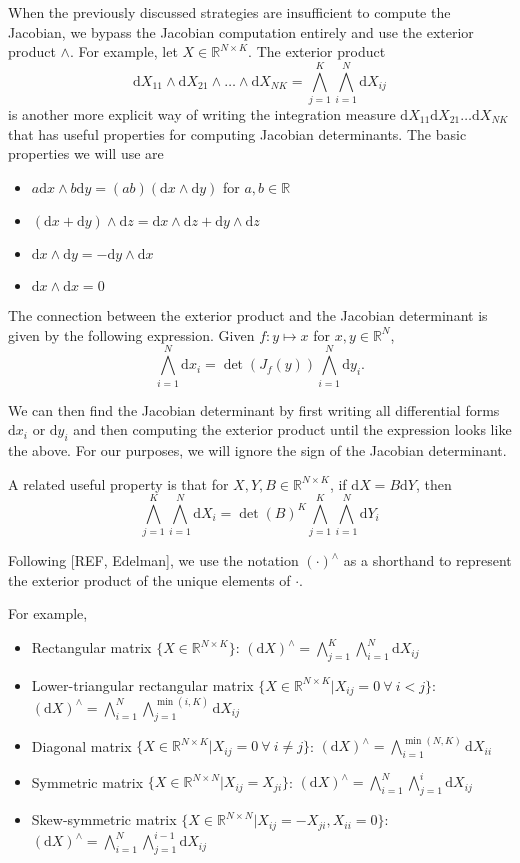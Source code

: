 \documentclass[11pt]{article}
\newcommand{\dv}[1]{\mathrm{d}{#1}}
\begin{document}
When the previously discussed strategies are insufficient to compute the Jacobian, we bypass the Jacobian computation entirely and use the exterior product $\wedge$.
For example, let $X \in \mathbb{R}^{N \times K}$.
The exterior product
\[
  \dv{X_{11} }\wedge \dv{X_{21}} \wedge \ldots \wedge \dv{X_{NK}} = \bigwedge_{j=1}^K \bigwedge_{i=1}^N \dv{X}_{ij}
\]
is another more explicit way of writing the integration measure $\dv{X_{11}} \dv{X_{21}} \dots \dv{X_{NK}}$ that has useful properties for computing Jacobian determinants.
The basic properties we will use are

\begin{itemize}
  \item $a\dv{x} \wedge b\dv{y} = (ab)(\dv{x} \wedge \dv{y})$ for $a,b \in \mathbb{R}$
  \item $(\dv{x} + \dv{y}) \wedge \dv{z} = \dv{x} \wedge \dv{z} + \dv{y} \wedge \dv{z}$
  \item $\dv{x} \wedge \dv{y} = - \dv{y} \wedge \dv{x}$
  \item $\dv{x} \wedge \dv{x} = 0$
\end{itemize}

The connection between the exterior product and the Jacobian determinant is given by the following expression.
Given $f: y \mapsto x$ for $x,y \in \mathbb{R}^N$,
\[\bigwedge_{i=1}^N \dv{x_i} = \det(J_f(y)) \bigwedge_{i=1}^N \dv{y_i}.\]

We can then find the Jacobian determinant by first writing all differential forms $\dv{x_i}$ or $\dv{y_i}$ and then computing the exterior product until the expression looks like the above.
For our purposes, we will ignore the sign of the Jacobian determinant.

A related useful property is that for $X,Y,B \in \mathbb{R}^{N \times K}$, if $\dv{X} = B \dv{Y}$, then
\[\bigwedge_{j=1}^K \bigwedge_{i=1}^N \dv{X_i} = \det(B)^K \bigwedge_{j=1}^K \bigwedge_{i=1}^N \dv{Y_i}\]

Following [REF, Edelman], we use the notation $(\cdot)^\wedge$ as a shorthand to represent the exterior product of the unique elements of $\cdot$.

For example,
\begin{itemize}
  \item Rectangular matrix $\{X \in \mathbb{R}^{N \times K}\}$: $(\dv{X})^\wedge = \bigwedge_{j=1}^K \bigwedge_{i=1}^N \dv{X_{ij}}$
  \item Lower-triangular rectangular matrix $\{X \in \mathbb{R}^{N \times K} | X_{ij} = 0\ \forall\ i < j\}$: $(\dv{X})^\wedge = \bigwedge_{i=1}^N \bigwedge_{j=1}^{\min(i, K)} \dv{X_{ij}}$
  \item Diagonal matrix $\{X \in \mathbb{R}^{N \times K} | X_{ij} = 0\ \forall\ i \ne j\}$: $(\dv{X})^\wedge = \bigwedge_{i=1}^{\min(N, K)} \dv{X_{ii}}$
  \item Symmetric matrix $\{X \in \mathbb{R}^{N \times N} | X_{ij} = X_{ji}\}$: $(\dv{X})^\wedge = \bigwedge_{i=1}^N \bigwedge_{j=1}^i \dv{X_{ij}}$
  \item Skew-symmetric matrix $\{X \in \mathbb{R}^{N \times N} | X_{ij} = -X_{ji}, X_{ii} = 0\}$: $(\dv{X})^\wedge = \bigwedge_{i=1}^N \bigwedge_{j=1}^{i-1} \dv{X_{ij}}$
\end{itemize}
\end{document}
